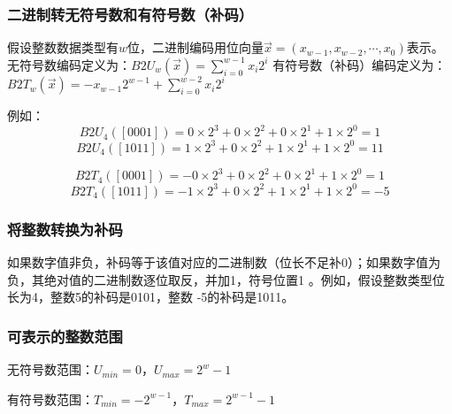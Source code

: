\subsubsection{二进制转无符号数和有符号数（补码）}
假设整数数据类型有\(w\)位，二进制编码用位向量\(\vec{x}=(x_{w - 1},x_{w - 2},\cdots,x_{0})\)表示。
无符号数编码定义为：\(B2U_{w}(\vec{x})=\sum\limits_{i = 0}^{w - 1}x_{i}2^{i}\)
有符号数（补码）编码定义为：\(B2T_{w}(\vec{x})=-x_{w - 1}2^{w - 1}+\sum\limits_{i = 0}^{w - 2}x_{i}2^{i}\)

例如：
\[B2U_{4}([0001])=0\times2^{3}+0\times2^{2}+0\times2^{1}+1\times2^{0}=1\]
\[B2U_{4}([1011])=1\times2^{3}+0\times2^{2}+1\times2^{1}+1\times2^{0}=11\]

\[B2T_{4}([0001])=-0\times2^{3}+0\times2^{2}+0\times2^{1}+1\times2^{0}=1\]
\[B2T_{4}([1011])=-1\times2^{3}+0\times2^{2}+1\times2^{1}+1\times2^{0}=-5\]

\subsubsection{将整数转换为补码}
如果数字值非负，补码等于该值对应的二进制数（位长不足补0）；如果数字值为负，其绝对值的二进制数逐位取反，并加1，符号位置1 。例如，假设整数类型位长为4，整数5的补码是0101，整数 -5的补码是1011。
\subsubsection{可表示的整数范围}
无符号数范围：\(U_{min}=0\)，\(U_{max}=2^{w}-1\)

有符号数范围：\(T_{min}=-2^{w - 1}\)，\(T_{max}=2^{w - 1}-1\)

